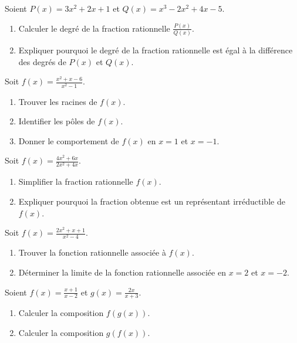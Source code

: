 \begin{exercice}
Soient \( P(x) = 3x^2 + 2x + 1 \) et \( Q(x) = x^3 - 2x^2 + 4x - 5 \).
\begin{enumerate}
    \item Calculer le degré de la fraction rationnelle \( \frac{P(x)}{Q(x)} \).
    \item Expliquer pourquoi le degré de la fraction rationnelle est égal à la différence des degrés de \( P(x) \) et \( Q(x) \).
\end{enumerate}
\end{exercice}

\begin{exercice}
Soit \( f(x) = \frac{x^2 + x - 6}{x^2 - 1} \).
\begin{enumerate}
    \item Trouver les racines de \( f(x) \).
    \item Identifier les pôles de \( f(x) \).
    \item Donner le comportement de \( f(x) \) en \( x = 1 \) et \( x = -1 \).
\end{enumerate}
\end{exercice}

\begin{exercice}
Soit \( f(x) = \frac{4x^2 + 6x}{2x^2 + 4x} \).
\begin{enumerate}
    \item Simplifier la fraction rationnelle \( f(x) \).
    \item Expliquer pourquoi la fraction obtenue est un représentant irréductible de \( f(x) \).
\end{enumerate}
\end{exercice}

\begin{exercice}
Soit \( f(x) = \frac{2x^2 + x + 1}{x^2 - 4} \).
\begin{enumerate}
    \item Trouver la fonction rationnelle associée à \( f(x) \).
    \item Déterminer la limite de la fonction rationnelle associée en \( x = 2 \) et \( x = -2 \).
\end{enumerate}
\end{exercice}

\begin{exercice}
Soient \( f(x) = \frac{x+1}{x-2} \) et \( g(x) = \frac{2x}{x+3} \).
\begin{enumerate}
    \item Calculer la composition \( f(g(x)) \).
    \item Calculer la composition \( g(f(x)) \).
\end{enumerate}
\end{exercice}

